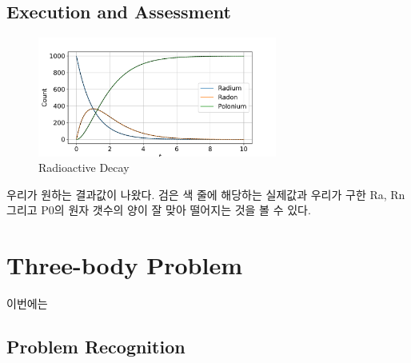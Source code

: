 \documentclass[11pt]{article}
\begin{document}
\subsection{Execution and Assessment}
\begin{figure}[!ht]
  \centering
  \includegraphics[width=0.7\textwidth]{Radium.pdf}
  \caption{Radioactive Decay}
\end{figure}
우리가 원하는 결과값이 나왔다. 검은 색 줄에 해당하는 실제값과 우리가 구한 Ra, Rn 그리고 P0의 원자 갯수의 양이 잘 맞아 떨어지는 것을 볼 수 있다.










\section{Three-body Problem}
이번에는
\subsection{Problem Recognition} 
\end{document}
